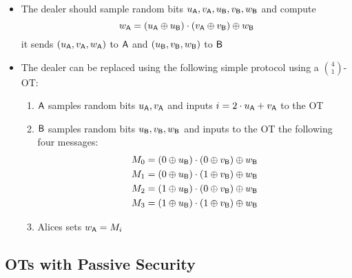 \begin{itemize}
    \begin{itemize}
        \item The dealer should sample random bits $u_{\mathsf{A}}, v_{\mathsf{A}}, u_{\mathsf{B}}, v_{\mathsf{B}}, w_{\mathsf{B}}$ and compute
        \begin{equation*}
            w_{\mathsf{A}} = (u_{\mathsf{A}} \oplus u_{\mathsf{B}}) \cdot (v_{\mathsf{A}} \oplus v_{\mathsf{B}}) \oplus w_{\mathsf{B}}
        \end{equation*}
        it sends $(u_{\mathsf{A}}, v_{\mathsf{A}}, w_{\mathsf{A}})$ to $\mathsf{A}$ and $(u_{\mathsf{B}}, v_{\mathsf{B}}, w_{\mathsf{B}})$ to $\mathsf{B}$
        \item The dealer can be replaced using the following simple protocol using a $4 \choose 1$-OT:
        \begin{enumerate}
            \item $\mathsf{A}$ samples random bits $u_{\mathsf{A}}, v_{\mathsf{A}}$ and inputs $i = 2 \cdot u_{\mathsf{A}} + v_{\mathsf{A}}$ to the OT
            \item $\mathsf{B}$ samples random bits $u_{\mathsf{B}}, v_{\mathsf{B}}, w_{\mathsf{B}}$ and inputs to the OT the following four messages:
            \begin{align*}
                M_0 &= (0 \oplus u_{\mathsf{B}}) \cdot (0 \oplus v_{\mathsf{B}}) \oplus w_{\mathsf{B}} \\
                M_1 &= (0 \oplus u_{\mathsf{B}}) \cdot (1 \oplus v_{\mathsf{B}}) \oplus w_{\mathsf{B}} \\
                M_2 &= (1 \oplus u_{\mathsf{B}}) \cdot (0 \oplus v_{\mathsf{B}}) \oplus w_{\mathsf{B}} \\
                M_3 &= (1 \oplus u_{\mathsf{B}}) \cdot (1 \oplus v_{\mathsf{B}}) \oplus w_{\mathsf{B}} \\
            \end{align*}
            \item Alices sets $w_{\mathsf{A}} = M_i$
        \end{enumerate}
    \end{itemize}
\end{itemize}

\subsection{OTs with Passive Security}

